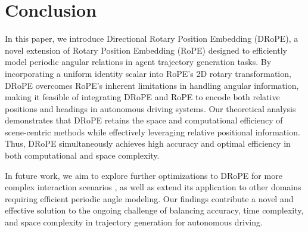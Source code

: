 \documentclass[lettersize,journal]{IEEEtran}
\theoremstyle{definition}
\begin{document}
\section{Conclusion}
In this paper, we introduce Directional Rotary Position Embedding (DRoPE), a novel extension of Rotary Position Embedding (RoPE) designed to efficiently model periodic angular relations in agent trajectory generation tasks. By incorporating a uniform identity scalar into RoPE's 2D rotary transformation, DRoPE overcomes RoPE’s inherent limitations in handling angular information, making it feasible of integrating DRoPE and RoPE to encode both relative positions and headings in autonomous driving systems. Our theoretical analysis demonstrates that DRoPE retains the space and computational efficiency of scene-centric methods while effectively leveraging relative positional information. Thus, DRoPE simultaneously achieves high accuracy and optimal efficiency in both computational and space complexity.

In future work, we aim to explore further optimizations to DRoPE for more complex interaction scenarios \cite{ren2021deep, tampuu2020survey}, as well as extend its application to other domains requiring efficient periodic angle modeling. Our findings contribute a novel and effective solution to the ongoing challenge of balancing accuracy, time complexity, and space complexity in trajectory generation for autonomous driving.




{\footnotesize %

}


\newpage
\end{document}
